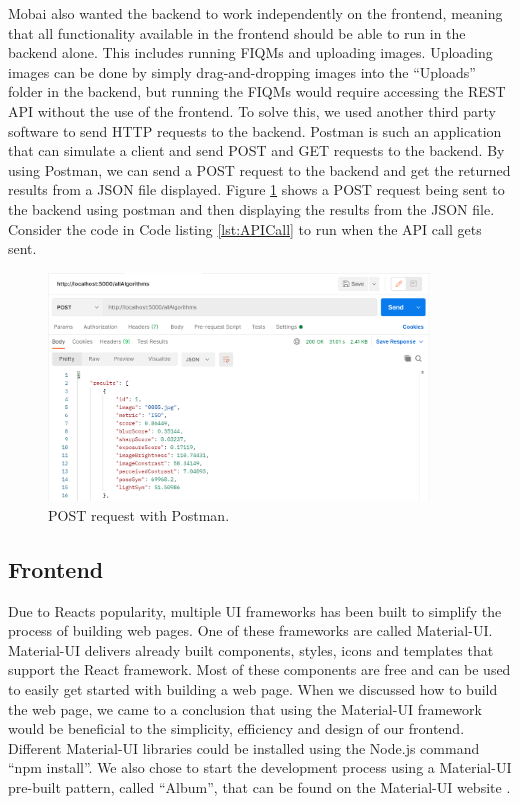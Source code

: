 Mobai also wanted the backend to work independently on the frontend, meaning that all functionality available in the frontend should be able to run in the backend alone. This includes running FIQMs and uploading images. Uploading images can be done by simply drag-and-dropping images into the ``Uploads'' folder in the backend, but running the FIQMs would require accessing the REST API without the use of the frontend. To solve this, we used another third party software to send HTTP requests to the backend. Postman is such an application that can simulate a client and send POST and GET requests to the backend. By using Postman, we can send a POST request to the backend and get the returned results from a JSON file displayed. Figure \ref{fig:postman} shows a POST request being sent to the backend using postman and then displaying the results from the JSON file. Consider the code in Code listing \ref{lst:APICall} to run when the API call gets sent. 

\begin{figure}[h]
    \centering
    \includegraphics[width=0.9\textwidth]
    {figures/postman_json.PNG}
    \caption{POST request with Postman.}
    \label{fig:postman}
\end{figure}

\subsection{Frontend}
Due to Reacts popularity, multiple UI frameworks has been built to simplify the process of building web pages. One of these frameworks are called Material-UI. Material-UI delivers already built components, styles, icons and templates that support the React framework. Most of these components are free and can be used to easily get started with building a web page. When we discussed how to build the web page, we came to a conclusion that using the Material-UI framework would be beneficial to the simplicity, efficiency and design of our frontend. Different Material-UI libraries could be installed using the Node.js command ``npm install''. We also chose to start the development process using a Material-UI pre-built pattern, called ``Album'', that can be found on the Material-UI website \cite{MaterialUI}. 

